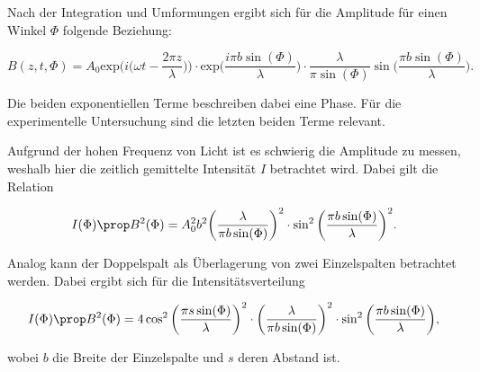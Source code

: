 Nach der Integration und Umformungen ergibt sich für die Amplitude für einen Winkel $\Phi$ folgende Beziehung:

\begin{equation}
    \label{eqn:amp-integration}
    B(z, t, \Phi) = A_0 \text{exp} \bigg( i \bigg( \omega t - \frac{2 \pi z}{\lambda} \bigg) \bigg) \cdot \text{exp} \bigg( \frac{i \pi b \sin (\Phi)}{\lambda} \bigg) \cdot \frac{\lambda}{\pi \sin( \Phi )} \sin \bigg( \frac{\pi b \sin(\Phi )}{\lambda} \bigg).
\end{equation}

Die beiden exponentiellen Terme beschreiben dabei eine Phase. Für die experimentelle Untersuchung sind die letzten beiden Terme relevant.

Aufgrund der hohen Frequenz von Licht ist es schwierig die Amplitude zu messen, weshalb hier die zeitlich gemittelte Intensität $I$ betrachtet wird. Dabei gilt die Relation

\begin{equation}
    \label{eqn:intensitaet-einzel}
    I ( \Phi ) \prop B^2 ( \Phi ) = A_0^2 b^2 \bigg( \frac{\lambda}{\pi b \sin ( \Phi )} \bigg)^2 \cdot \sin^2 \bigg( \frac{\pi b \sin(\Phi)}{\lambda} \bigg)^2.
\end{equation}

Analog kann der Doppelspalt als Überlagerung von zwei Einzelspalten betrachtet werden.
Dabei ergibt sich für die Intensitätsverteilung

\begin{equation}
    \label{eqn:intensitaet-doppel}
    I ( \Phi ) \prop B^2 (\Phi ) = 4 \cos^2 \bigg ( \frac{\pi s \sin( \Phi )}{\lambda} \bigg)^2 \cdot \bigg( \frac{\lambda}{\pi b \sin( \Phi )} \bigg)^2 \cdot \sin^2 \bigg( \frac{\pi b \sin ( \Phi )}{\lambda} \bigg),
\end{equation}

wobei $b$ die Breite der Einzelspalte und $s$ deren Abstand ist.